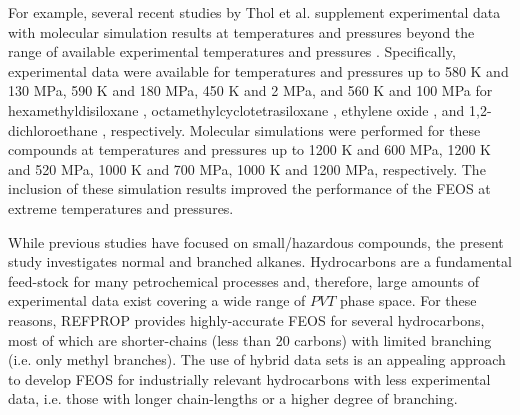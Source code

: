 \documentclass[journal=jctc,manuscript=article]{achemso}
\begin{document}
For example, several recent studies by Thol et al. supplement experimental data with molecular simulation results at temperatures and pressures beyond the range of available experimental temperatures and pressures \cite{Thol2016_siloxane_first,Thol2016_siloxane,Thol2017,Thol2015}. Specifically, experimental data were available for temperatures and pressures up to 580 K and 130 MPa, 590 K and 180 MPa, 450 K and 2 MPa, and 560 K and 100 MPa for hexamethyldisiloxane \cite{Thol2016_siloxane_first}, octamethylcyclotetrasiloxane \cite{Thol2016_siloxane}, ethylene oxide \cite{Thol2015}, and 1,2-dichloroethane \cite{Thol2017}, respectively. Molecular simulations were performed for these compounds at temperatures and pressures up to 1200 K and 600 MPa, 1200 K and 520 MPa, 1000 K and 700 MPa, 1000 K and 1200 MPa, respectively. The inclusion of these simulation results improved the performance of the FEOS at extreme temperatures and pressures. 

% 

While previous studies have focused on small/hazardous compounds, the present study investigates normal and branched alkanes. Hydrocarbons are a fundamental feed-stock for many petrochemical processes and, therefore, large amounts of experimental data exist covering a wide range of $PVT$ phase space. For these reasons, REFPROP provides highly-accurate FEOS for several hydrocarbons, most of which are shorter-chains (less than 20 carbons) with limited branching (i.e. only methyl branches). The use of hybrid data sets is an appealing approach to develop FEOS for industrially relevant hydrocarbons with less experimental data, i.e. those with longer chain-lengths or a higher degree of branching.


\end{document}
